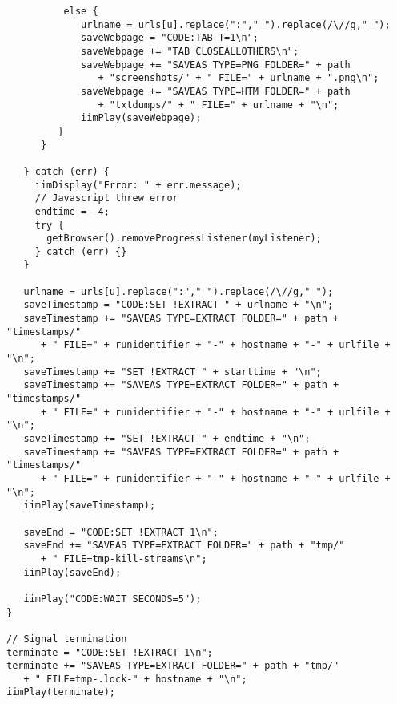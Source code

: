 \begin{verbatim}
          else {
             urlname = urls[u].replace(":","_").replace(/\//g,"_");
             saveWebpage = "CODE:TAB T=1\n";
             saveWebpage += "TAB CLOSEALLOTHERS\n";
             saveWebpage += "SAVEAS TYPE=PNG FOLDER=" + path 
                + "screenshots/" + " FILE=" + urlname + ".png\n";
             saveWebpage += "SAVEAS TYPE=HTM FOLDER=" + path 
                + "txtdumps/" + " FILE=" + urlname + "\n";
             iimPlay(saveWebpage);
         }
      }
		
   } catch (err) {
     iimDisplay("Error: " + err.message);
     // Javascript threw error
     endtime = -4;
     try {
       getBrowser().removeProgressListener(myListener);
     } catch (err) {}
   }
	
   urlname = urls[u].replace(":","_").replace(/\//g,"_");
   saveTimestamp = "CODE:SET !EXTRACT " + urlname + "\n";
   saveTimestamp += "SAVEAS TYPE=EXTRACT FOLDER=" + path + "timestamps/" 
      + " FILE=" + runidentifier + "-" + hostname + "-" + urlfile + "\n";
   saveTimestamp += "SET !EXTRACT " + starttime + "\n";
   saveTimestamp += "SAVEAS TYPE=EXTRACT FOLDER=" + path + "timestamps/" 
      + " FILE=" + runidentifier + "-" + hostname + "-" + urlfile + "\n";
   saveTimestamp += "SET !EXTRACT " + endtime + "\n";
   saveTimestamp += "SAVEAS TYPE=EXTRACT FOLDER=" + path + "timestamps/" 
      + " FILE=" + runidentifier + "-" + hostname + "-" + urlfile + "\n";
   iimPlay(saveTimestamp);
	
   saveEnd = "CODE:SET !EXTRACT 1\n";
   saveEnd += "SAVEAS TYPE=EXTRACT FOLDER=" + path + "tmp/" 
      + " FILE=tmp-kill-streams\n";
   iimPlay(saveEnd);
	
   iimPlay("CODE:WAIT SECONDS=5");
}

// Signal termination
terminate = "CODE:SET !EXTRACT 1\n";
terminate += "SAVEAS TYPE=EXTRACT FOLDER=" + path + "tmp/" 
   + " FILE=tmp-.lock-" + hostname + "\n";
iimPlay(terminate);
\end{verbatim}
